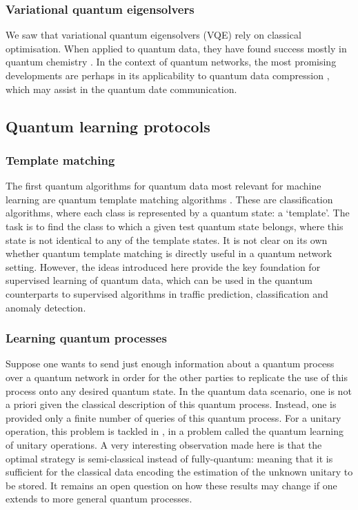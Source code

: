 \documentclass[twocolumn, aps, rmp, amsmath, amssymb, nofootinbib, superscriptaddress, longbibliography, floatfix, table-of-contents, eqsecnum]{revtex4}
\begin{document}
\subsubsection{Variational quantum eigensolvers}

We saw that variational quantum eigensolvers (VQE) rely on classical optimisation. When applied to quantum data, they have found success mostly in quantum chemistry \cite{bib:peruzzo2014peruzzo, bib:moll2018quantum}. In the context of quantum networks, the most promising developments are perhaps in its applicability to quantum data compression \cite{bib:jonromero}, which may assist in the quantum date communication. 


\subsection{Quantum learning protocols}

\subsubsection{Template matching}

The first quantum algorithms for quantum data most relevant for machine learning are quantum template matching algorithms \cite{bib:saski1, bib:sasaki2}. These are classification algorithms, where each class is represented by a quantum state: a `template'. The task is to find the class to which a given test quantum state belongs, where this state is not identical to any of the template states. It is not clear on its own whether quantum template matching is directly useful in a quantum network setting. However, the ideas introduced here provide the key foundation for supervised learning of quantum data, which can be used in the quantum counterparts to supervised algorithms in traffic prediction, classification and anomaly detection.

\subsubsection{Learning quantum processes}

Suppose one wants to send just enough information about a quantum process over a quantum network in order for the other parties to replicate the use of this process onto any desired quantum state. In the quantum data scenario, one is not a priori given the classical description of this quantum process. Instead, one is provided only a finite number of queries of this quantum process. For a unitary operation, this problem is tackled in \cite{bib:bisio_optimal_2010}, in a problem called the quantum learning of unitary operations. A very interesting observation made here is that the optimal strategy is semi-classical instead of fully-quantum: meaning that it is sufficient for the classical data encoding the estimation of the unknown unitary to be stored. It remains an open question on how these results may change if one extends to more general quantum processes.
\end{document}
